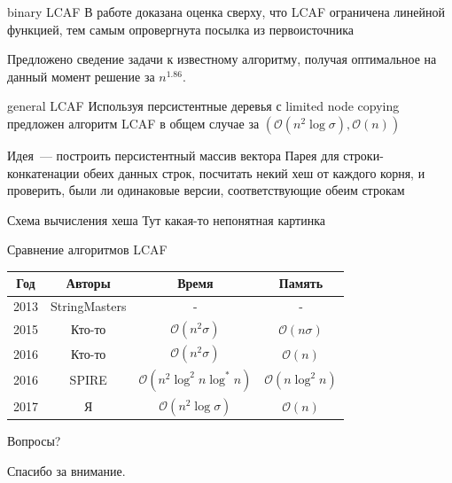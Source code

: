 \documentclass[hyperref=unicode,graphics=pdflatex,12pt]{beamer}
\begin{document}
\begin{frame}{binary LCAF}
\vspace{0.5cm}
В работе доказана оценка сверху, что LCAF ограничена линейной функцией, тем самым опровергнута посылка из первоисточника

\vspace{0.5cm}
Предложено сведение задачи к известному алгоритму, получая оптимальное на данный момент решение за $n^{1.86}$.
\end{frame}

\begin{frame}{general LCAF}
Используя персистентные деревья с limited node copying предложен алгоритм LCAF в общем случае за $(\mathcal{O}(n^2 \log \sigma), \mathcal{O}(n))$

\vspace{0.5cm}
Идея~--- построить персистентный массив вектора Парея для строки-конкатенации обеих данных строк, посчитать некий хеш от каждого корня, и проверить, были ли одинаковые версии, соответствующие обеим строкам
\end{frame}


\begin{frame}{Схема вычисления хеша}
Тут какая-то непонятная картинка
\end{frame}

\begin{frame}{Сравнение алгоритмов LCAF}
\begin{tabular}{|c|c|c|c|}
\hline
Год & Авторы & Время & Память \\
\hline
2013 & StringMasters & - & - \\
\hline
2015 & Кто-то & $\mathcal{O}(n^2 \sigma)$ & $\mathcal{O}(n \sigma)$ \\
\hline
2016 & Кто-то & $\mathcal{O}(n^2 \sigma)$ & $\mathcal{O}(n)$ \\
\hline
2016 & SPIRE & $\mathcal{O}(n^2 \log^2 n \log^* n)$ & $\mathcal{O}(n \log^2 n)$ \\
\hline
2017 & Я & $\mathcal{O}(n^2 \log \sigma)$ & $\mathcal{O}(n)$ \\
\hline
\end{tabular}
\end{frame}

\begin{frame}{Вопросы?}
\begin{center}
Спасибо за внимание.
\end{center}
\end{frame}
\end{document}
